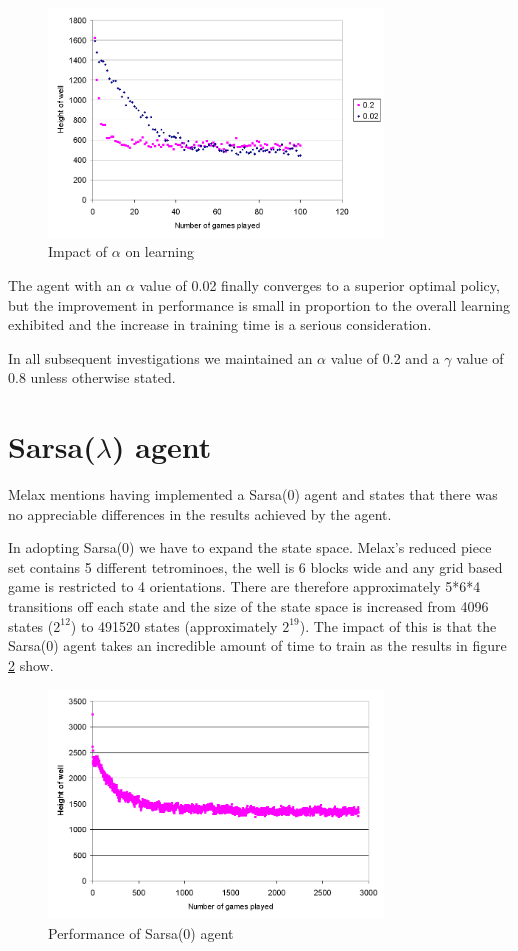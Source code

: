 \documentclass{rucsthesis}
\begin{document}
\begin{figure}[h]
\centering
\includegraphics[width=3.5in]{alphacomp.png}
\caption{Impact of $\alpha$ on learning}
\label{fig:alpha}
\end{figure} 

The agent with an $\alpha$ value of 0.02 finally converges to a superior optimal policy, but the improvement in performance is small in proportion to the overall learning exhibited and the increase in training time is a serious consideration.

In all subsequent investigations we maintained an $\alpha$ value of 0.2 and a $\gamma$ value of 0.8 unless otherwise stated.

\section{Sarsa($\lambda$) agent}

Melax mentions having implemented a Sarsa(0) agent and states that there was no appreciable differences in the results achieved by the agent. 

In adopting Sarsa(0) we have to expand the state space. Melax's reduced piece set contains 5 different tetrominoes, the well is 6 blocks wide and any grid based game is restricted to 4 orientations. There are therefore approximately 5*6*4 transitions off each state and the size of the state space is increased from 4096 states ($2^{12}$) to 491520 states (approximately $2^{19}$). The impact of this is that the Sarsa(0) agent takes an incredible amount of time to train as the results in figure \ref{fig:melaxsarsa} show.

\begin{figure}[h]
\centering
\includegraphics[width=3.5in]{sarsamelax.png}
\caption{Performance of Sarsa(0) agent}
\label{fig:melaxsarsa}
\end{figure} 
\end{document}
